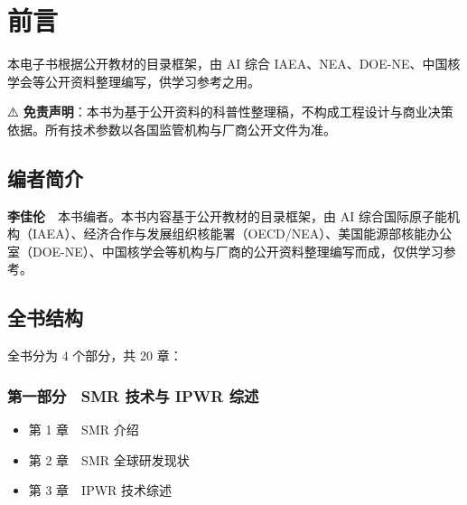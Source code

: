 \documentclass[
  UTF8,
  scheme=plain,
  fontsize=10pt,
  openany
]{ctexbook}
\begin{document}


\frontmatter
{}

\cleardoublepage
\tableofcontents

\cleardoublepage
\mainmatter
{}

\cleardoublepage

\chapter*{前言}\label{ux524dux8a00}

\begin{epigraph}

本电子书根据公开教材的目录框架，由 AI 综合
IAEA、NEA、DOE-NE、中国核学会等公开资料整理编写，供学习参考之用。

⚠️
\textbf{免责声明}：本书为基于公开资料的科普性整理稿，不构成工程设计与商业决策依据。所有技术参数以各国监管机构与厂商公开文件为准。

\end{epigraph}

\section*{编者简介}\label{ux7f16ux8005ux7b80ux4ecb}

\textbf{李佳伦}　本书编者。本书内容基于公开教材的目录框架，由 AI
综合国际原子能机构（IAEA）、经济合作与发展组织核能署（OECD/NEA）、美国能源部核能办公室（DOE-NE）、中国核学会等机构与厂商的公开资料整理编写而成，仅供学习参考。

\section*{全书结构}\label{ux5168ux4e66ux7ed3ux6784}

全书分为 4 个部分，共 20 章：

\subsection*{第一部分　SMR 技术与 IPWR
综述}\label{ux7b2cux4e00ux90e8ux5206-smr-ux6280ux672fux4e0e-ipwr-ux7efcux8ff0}

\begin{itemize}
\tightlist
\item
  第 1 章　SMR 介绍
\item
  第 2 章　SMR 全球研发现状
\item
  第 3 章　IPWR 技术综述
\end{itemize}
\end{document}

